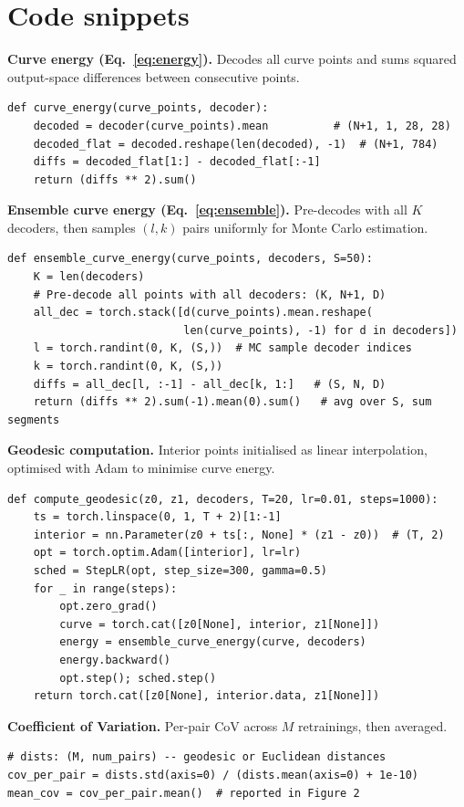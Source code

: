 \documentclass[10pt,a4paper]{article}
\begin{document}
\newpage


\section*{Code snippets}

\textbf{Curve energy (Eq.~\ref{eq:energy}).} Decodes all curve points and sums squared output-space differences between consecutive points.
\begin{lstlisting}
def curve_energy(curve_points, decoder):
    decoded = decoder(curve_points).mean          # (N+1, 1, 28, 28)
    decoded_flat = decoded.reshape(len(decoded), -1)  # (N+1, 784)
    diffs = decoded_flat[1:] - decoded_flat[:-1]
    return (diffs ** 2).sum()
\end{lstlisting}

\textbf{Ensemble curve energy (Eq.~\ref{eq:ensemble}).} Pre-decodes with all $K$ decoders, then samples $(l,k)$ pairs uniformly for Monte Carlo estimation.
\begin{lstlisting}
def ensemble_curve_energy(curve_points, decoders, S=50):
    K = len(decoders)
    # Pre-decode all points with all decoders: (K, N+1, D)
    all_dec = torch.stack([d(curve_points).mean.reshape(
                           len(curve_points), -1) for d in decoders])
    l = torch.randint(0, K, (S,))  # MC sample decoder indices
    k = torch.randint(0, K, (S,))
    diffs = all_dec[l, :-1] - all_dec[k, 1:]   # (S, N, D)
    return (diffs ** 2).sum(-1).mean(0).sum()   # avg over S, sum segments
\end{lstlisting}

\textbf{Geodesic computation.} Interior points initialised as linear interpolation, optimised with Adam to minimise curve energy.
\begin{lstlisting}
def compute_geodesic(z0, z1, decoders, T=20, lr=0.01, steps=1000):
    ts = torch.linspace(0, 1, T + 2)[1:-1]
    interior = nn.Parameter(z0 + ts[:, None] * (z1 - z0))  # (T, 2)
    opt = torch.optim.Adam([interior], lr=lr)
    sched = StepLR(opt, step_size=300, gamma=0.5)
    for _ in range(steps):
        opt.zero_grad()
        curve = torch.cat([z0[None], interior, z1[None]])
        energy = ensemble_curve_energy(curve, decoders)
        energy.backward()
        opt.step(); sched.step()
    return torch.cat([z0[None], interior.data, z1[None]])
\end{lstlisting}

\textbf{Coefficient of Variation.} Per-pair CoV across $M$ retrainings, then averaged.
\begin{lstlisting}
# dists: (M, num_pairs) -- geodesic or Euclidean distances
cov_per_pair = dists.std(axis=0) / (dists.mean(axis=0) + 1e-10)
mean_cov = cov_per_pair.mean()  # reported in Figure 2
\end{lstlisting}
\end{document}
